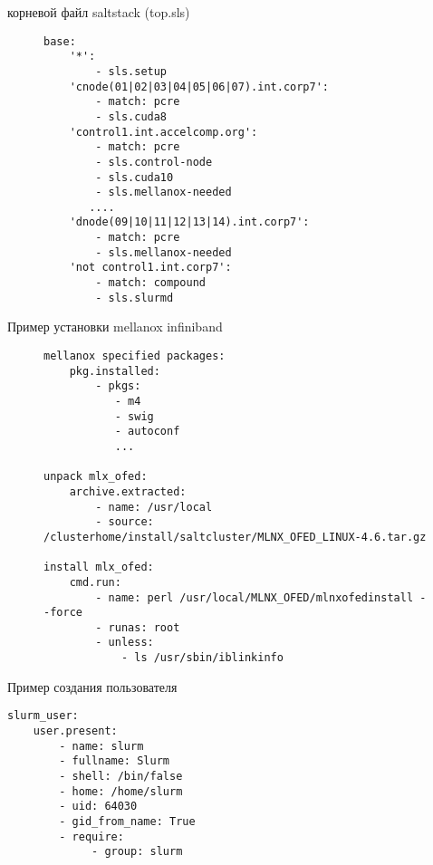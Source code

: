 \documentclass{beamer}
\begin{document}
\begin{frame}[fragile]{корневой файл saltstack (top.sls)}
	\begin{figure}[H]
\centering
\begin{verbatim}
base:
    '*':
        - sls.setup
    'cnode(01|02|03|04|05|06|07).int.corp7':
        - match: pcre
        - sls.cuda8
    'control1.int.accelcomp.org':
        - match: pcre
        - sls.control-node
        - sls.cuda10
        - sls.mellanox-needed
       ....
    'dnode(09|10|11|12|13|14).int.corp7':
        - match: pcre
        - sls.mellanox-needed
    'not control1.int.corp7':
        - match: compound
        - sls.slurmd
\end{verbatim}
\end{figure}
\end{frame}

\begin{frame}[fragile]{Пример установки mellanox infiniband}

\begin{figure}[H]
\begin{verbatim}
mellanox specified packages:
    pkg.installed:
        - pkgs:
           - m4 
           - swig
           - autoconf
           ...

unpack mlx_ofed:
    archive.extracted:
        - name: /usr/local
        - source: /clusterhome/install/saltcluster/MLNX_OFED_LINUX-4.6.tar.gz

install mlx_ofed:
    cmd.run:
        - name: perl /usr/local/MLNX_OFED/mlnxofedinstall --force
        - runas: root
        - unless:
            - ls /usr/sbin/iblinkinfo
\end{verbatim}
\end{figure}
\end{frame}

\begin{frame}[fragile]{Пример создания пользователя}
\begin{verbatim}
slurm_user:
    user.present:
        - name: slurm
        - fullname: Slurm
        - shell: /bin/false
        - home: /home/slurm
        - uid: 64030
        - gid_from_name: True
        - require:
             - group: slurm
\end{verbatim}    
\end{frame}
\end{document}
